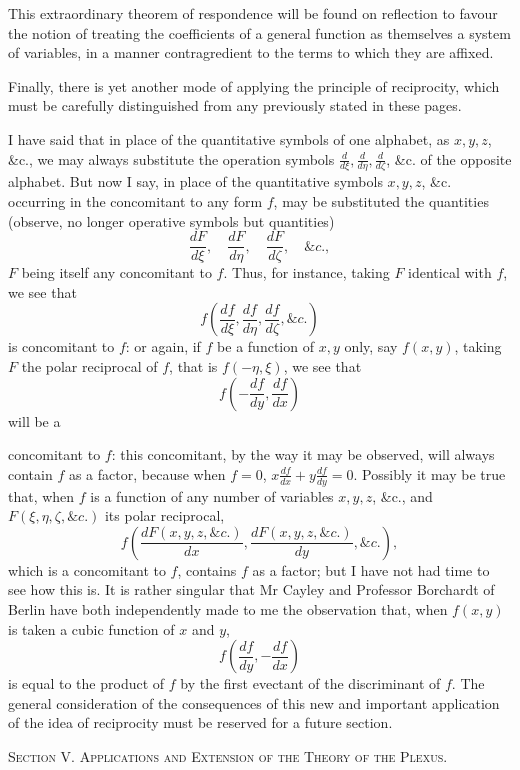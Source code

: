 \documentclass[11pt]{article}
\newcommand{\subpaperhead}[1]{\begin{center}{\large\scshape #1}\end{center}}
\newcommand{\sourcepage}[1]{\marginpar{\scriptsize p.~#1}}
\begin{document}
This extraordinary theorem of respondence will be found on reflection to favour the notion of treating the coefficients of a general function as themselves a system of variables, in a manner contragredient to the terms to which they are affixed.

Finally, there is yet another mode of applying the principle of reciprocity, which must be carefully distinguished from any previously stated in these pages.

I have said that in place of the quantitative symbols of one alphabet, as $x,y,z$, \&c., we may always substitute the operation symbols $\frac{d}{d\xi},\frac{d}{d\eta},\frac{d}{d\zeta}$, \&c. of the opposite alphabet. But now I say, in place of the quantitative symbols $x,y,z$, \&c. occurring in the concomitant to any form $f$, may be substituted the quantities (observe, no longer operative symbols but quantities)
\[
\frac{dF}{d\xi},\quad \frac{dF}{d\eta},\quad \frac{dF}{d\zeta},\quad \&c.,
\]
$F$ being itself any concomitant to $f$. Thus, for instance, taking $F$ identical with $f$, we see that
\[
f\left(\frac{df}{d\xi},\frac{df}{d\eta},\frac{df}{d\zeta},\&c.\right)
\]
is concomitant to $f$: or again, if $f$ be a function of $x,y$ only, say $f(x,y)$, taking $F$ the polar reciprocal of $f$, that is $f(-\eta,\xi)$, we see that
\[
f\left(-\frac{df}{dy},\frac{df}{dx}\right)
\]
will be a

\sourcepage{342}
concomitant to $f$: this concomitant, by the way it may be observed, will always contain $f$ as a factor, because when $f=0$, $x\frac{df}{dx}+y\frac{df}{dy}=0$. Possibly it may be true that, when $f$ is a function of any number of variables $x,y,z$, \&c., and $F(\xi,\eta,\zeta,\&c.)$ its polar reciprocal,
\[
f\left(\frac{dF(x,y,z,\&c.)}{dx},\frac{dF(x,y,z,\&c.)}{dy},\&c.\right),
\]
which is a concomitant to $f$, contains $f$ as a factor; but I have not had time to see how this is. It is rather singular that Mr Cayley and Professor Borchardt of Berlin have both independently made to me the observation that, when $f(x,y)$ is taken a cubic function of $x$ and $y$,
\[
f\left(\frac{df}{dy},-\frac{df}{dx}\right)
\]
is equal to the product of $f$ by the first evectant of the discriminant of $f$. The general consideration of the consequences of this new and important application of the idea of reciprocity must be reserved for a future section.

\subpaperhead{Section V. \quad Applications and Extension of the Theory of the Plexus.}
\end{document}
